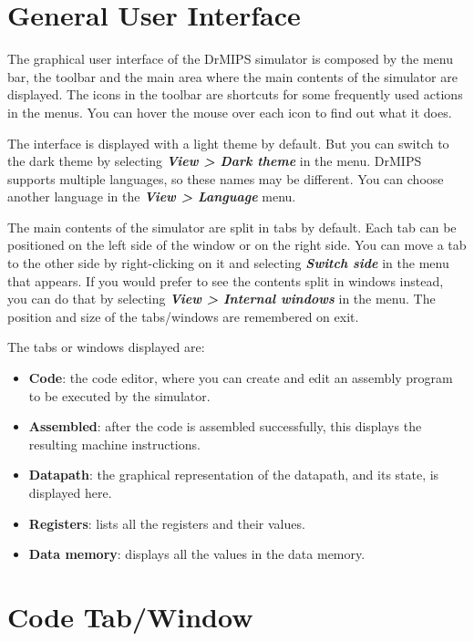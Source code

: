 \documentclass[11pt,a4paper,twoside,titlepage]{article}
\author{Bruno Nova}
\title{\Title}
\newcommand{\menupath}[1]{\textbf{\emph{#1}}}
\begin{document}
\maketitle
\tableofcontents
\newpage

\section{General User Interface}

The graphical user interface of the DrMIPS simulator is composed by the menu 
bar, the toolbar and the main area where the main contents of the simulator 
are displayed.
The icons in the toolbar are shortcuts for some frequently used actions in the
menus. You can hover the mouse over each icon to find out what it does.

The interface is displayed with a light theme by default. But you can switch
to the dark theme by selecting \menupath{View > Dark theme} in the menu.
DrMIPS supports multiple languages, so these names may be different.
You can choose another language in the \menupath{View > Language} menu.

The main contents of the simulator are split in tabs by default. Each tab can
be positioned on the left side of the window or on the right side. 
You can move a tab to the other side by right-clicking on it and selecting 
\menupath{Switch side} in the menu that appears.
If you would prefer to see the contents split in windows instead, you can do
that by selecting \menupath{View > Internal windows} in the menu.
The position and size of the tabs/windows are remembered on exit.

The tabs or windows displayed are:
\begin{itemize}
	\item \textbf{Code}: the code editor, where you can create and edit an
		assembly program to be executed by the simulator.
	\item \textbf{Assembled}: after the code is assembled successfully, this
		displays the resulting machine instructions.
	\item \textbf{Datapath}: the graphical representation of the datapath,
		and its state, is displayed here.
	\item \textbf{Registers}: lists all the registers and their values.
	\item \textbf{Data memory}: displays all the values in the data memory.
\end{itemize}


\section{Code Tab/Window}
\end{document}
